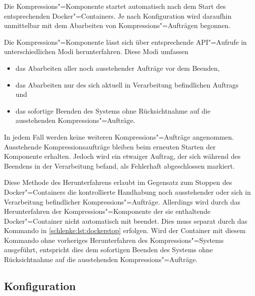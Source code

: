 Die Kompressions"=Komponente startet automatisch nach dem Start des entsprechenden Docker"=Containers. Je nach Konfiguration wird daraufhin unmittelbar mit dem Abarbeiten von Kompressions"=Aufträgen begonnen. 

Die Kompressions"=Komponente lässt sich über entsprechende API"=Aufrufe in unterschiedlichen Modi herunterfahren. Diese Modi umfassen
\begin{itemize}
\item das Abarbeiten aller noch ausstehender Aufträge vor dem Beenden,
\item das Abarbeiten nur des sich aktuell in Verarbeitung befindlichen Auftrags und
\item das sofortige Beenden des Systems ohne Rücksichtnahme auf die ausstehenden Kompressions"=Aufträge.
\end{itemize} 
In jedem Fall werden keine weiteren Kompressions"=Aufträge angenommen. Ausstehende Kompressionsaufträge bleiben beim erneuten Starten der Komponente erhalten. Jedoch wird ein etwaiger Auftrag, der sich während des Beendens in der Verarbeitung befand, als \glqq{}Fehlerhaft abgeschlossen\grqq{} markiert.

Diese Methode des Herunterfahrens erlaubt im Gegensatz zum Stoppen des Docker"=Containers die kontrollierte Handhabung noch ausstehender oder sich in Verarbeitung befindlicher Kompressions"=Aufträge. Allerdings wird durch das Herunterfahren der Kompressions"=Komponente der sie enthaltende Docker"=Container nicht automatisch mit beendet. Dies muss separat durch das Kommando in \autoref{schlenke:lst:dockerstop} erfolgen. Wird der Container mit diesem Kommando ohne vorheriges Herunterfahren des Kompressions"=Systems ausgeführt, entspricht dies dem sofortigen Beenden des Systems ohne Rücksichtnahme auf die ausstehenden Kompressions"=Aufträge.

\subsection{Konfiguration}
\label{schlenke:chp:configuration}

